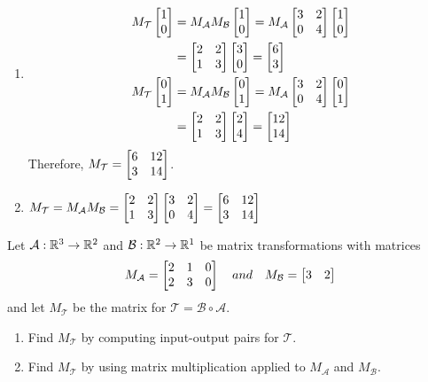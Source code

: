 \begin{exercises}
\begin{problist}
\begin{solution}
			\begin{enumerate}
				\item 
				\begin{align*}
					M_{\mathcal{T}}\mat{1\\0}&=M_{\mathcal A}M_{\mathcal{B}}\mat{1\\0}=M_{\mathcal A}\mat{3&2\\0&4}\mat{1\\0}\\
					&=\mat{2&2\\1&3}\mat{3\\0}=\mat{6\\3}\\
					M_{\mathcal{T}}\mat{0\\1}&=M_{\mathcal A}M_{\mathcal B}\mat{0\\1}=M_{\mathcal A}\mat{3&2\\0&4}\mat{0\\1}\\
					&=\mat{2&2\\1&3}\mat{2\\4}=\mat{12\\14}
				\end{align*}
				Therefore, $M_{\mathcal T}=\mat{6&12\\3&14}$.

				\item $M_{\mathcal T}= M_{\mathcal A}M_{\mathcal B}= \mat{2&2\\1&3}\mat{3&2\\0&4}=
					\mat{6&12\\3&14}$
			\end{enumerate}
		\end{solution}

		\prob Let $\mathcal A: \mathbb{R}^{3}\to \mathbb{R}^{2}$ and $\mathcal B: \mathbb{R}^{2}\to \mathbb{R}^{1}$
		be matrix transformations with matrices
		\[
			M_{\mathcal A}= \mat{2&1&0\\2&3&0}\quad and \quad M_{\mathcal B}=
			\mat{3&2}
		\]
		 and let $M_{\mathcal T}$ be the matrix for $\mathcal T=\mathcal B\circ \mathcal
		A$.
		\begin{enumerate}
			\item Find $M_{\mathcal T}$ by computing input-output pairs for $\mathcal
				T$.

			\item Find $M_{\mathcal T}$ by using matrix multiplication applied
				to $M_{\mathcal A}$ and $M_{\mathcal B}$.
		\end{enumerate}


\end{problist}
\end{exercises}
